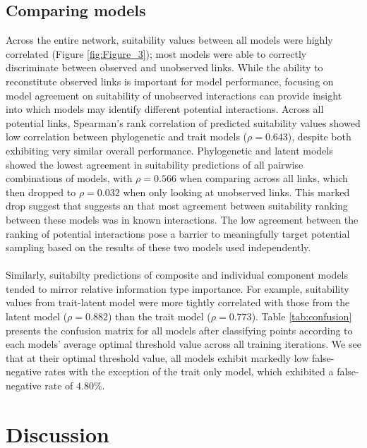 \documentclass[num-refs]{wiley-article}%
\begin{document}
\subsection*{Comparing models}
Across the entire network, suitability values between all models were highly correlated (Figure \ref{fig:Figure_3}); most models were able to correctly discriminate between observed and unobserved links. While the ability to reconstitute observed links is important for model performance, focusing on model agreement on suitability of unobserved interactions can provide insight into which models may identify different potential interactions. Across all potential links, Spearman's rank correlation of predicted suitability values showed low correlation between phylogenetic and trait models ($\rho = 0.643$), despite both exhibiting very similar overall performance. Phylogenetic and latent models showed the lowest agreement in suitability predictions of all pairwise combinations of models, with $\rho = 0.566$ when comparing across all links, which then dropped to $\rho = 0.032$ when only looking at unobserved links. This marked drop suggest that suggests an that most agreement between suitability ranking between these models was in known interactions. The low agreement between the ranking of potential interactions pose a barrier to meaningfully target potential sampling based on the results of these two models used independently.

\paragraph*{}
Similarly, suitabilty predictions of composite and individual component models tended to mirror relative information type importance. For example, suitability values from trait-latent model were more tightly correlated with those from the latent model ($\rho=0.882$) than the trait model ($\rho=0.773$). Table \ref{tab:confusion} presents the confusion matrix for all models after classifying points according to each models' average optimal threshold value across all training iterations. We see that at their optimal threshold value, all models exhibit markedly low false-negative rates with the exception of the trait only model, which exhibited a false-negative rate of $4.80\%$.








\section*{Discussion}
\end{document}
